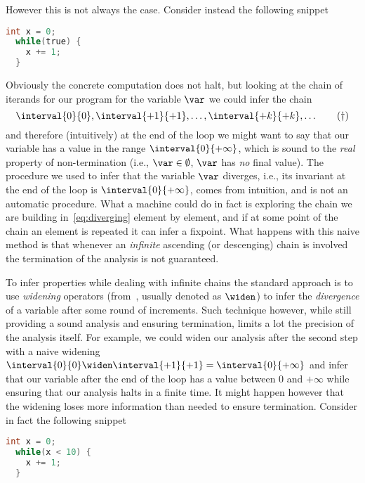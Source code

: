 \noindent
However this is not always the case. Consider instead the following
snippet
\begin{lstlisting}[language=C, caption=Program with a divergent loop, label=exampleloop]
  int x = 0;
  while(true) {
    x += 1;
  }
\end{lstlisting}
Obviously the concrete computation does not halt, but looking at the
chain of iterands for our program for the variable \(\var\) we could
infer the chain
\begin{equation}\label{eq:diverging}
  \interval{0}{0}, \interval{+1}{+1}, \dots, \interval{+k}{+k}, \dots
  \tag{\dag}
\end{equation}
and therefore (intuitively) at the end of the loop we might want to
say that our variable has a value in the range
\(\interval{0}{+\infty}\), which is sound to the \emph{real} property
of non-termination (i.e., \(\var\in\emptyset\), \(\var\) has \emph{no}
final value). The procedure we used to infer that the variable
\(\var\) diverges, i.e., its invariant at the end of the loop is
\(\interval{0}{+\infty}\), comes from intuition, and is not an
automatic procedure. What a machine could do in fact is exploring the
chain we are building in~\eqref{eq:diverging} element by element, and
if at some point of the chain an element is repeated it can infer a
fixpoint.  What happens with this naive method is that whenever an
\emph{infinite} ascending (or descenging) chain is involved the
termination of the analysis is not guaranteed.

To infer properties while dealing with infinite chains the standard
approach is to use \emph{widening} operators
(from~\cite{10.1007/3-540-55844-6_142}, usually denoted as \(\widen\))
to infer the \emph{divergence} of a variable after some round of
increments. Such technique however, while still providing a sound
analysis and ensuring termination, limits a lot the precision of the
analysis itself. For example, we could widen our analysis after the
second step with a naive widening
\(\interval{0}{0} \widen \interval{+1}{+1} = \interval{0}{+\infty}\)
and infer that our variable after the end of the loop has a value
between \(0\) and \(+\infty\) while ensuring that our analysis halts
in a finite time.  It might happen however that the widening loses
more information than needed to ensure termination. Consider in fact
the following snippet

\begin{lstlisting}[language=C, caption=Program with a convergent loop,
  label=exampleloopconverges]
  int x = 0;
  while(x < 10) {
    x += 1;
  }
\end{lstlisting}

